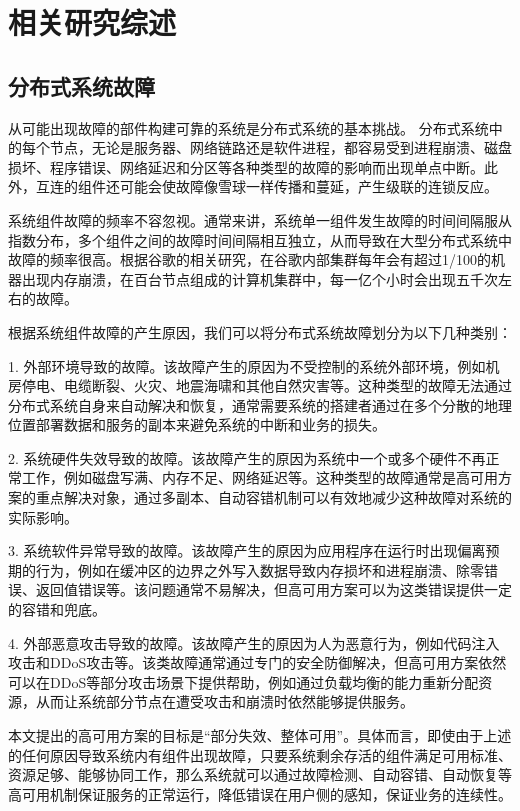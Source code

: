 
\chapter{相关研究综述}

\section{分布式系统故障}

从可能出现故障的部件构建可靠的系统是分布式系统的基本挑战。
分布式系统中的每个节点，无论是服务器、网络链路还是软件进程，都容易受到进程崩溃、磁盘损坏、程序错误、网络延迟和分区等各种类型的故障的影响而出现单点中断。此外，互连的组件还可能会使故障像雪球一样传播和蔓延，产生级联的连锁反应。

系统组件故障的频率不容忽视。通常来讲，系统单一组件发生故障的时间间隔服从指数分布，多个组件之间的故障时间间隔相互独立，从而导致在大型分布式系统中故障的频率很高。根据谷歌的相关研究\cite{beyer2016site}，在谷歌内部集群每年会有超过1/100的机器出现内存崩溃，在百台节点组成的计算机集群中，每一亿个小时会出现五千次左右的故障。

根据系统组件故障的产生原因，我们可以将分布式系统故障划分为以下几种类别\cite{michaud20062}：

1. 外部环境导致的故障。该故障产生的原因为不受控制的系统外部环境，例如机房停电、电缆断裂、火灾、地震海啸和其他自然灾害等。这种类型的故障无法通过分布式系统自身来自动解决和恢复，通常需要系统的搭建者通过在多个分散的地理位置部署数据和服务的副本来避免系统的中断和业务的损失。

2. 系统硬件失效导致的故障。该故障产生的原因为系统中一个或多个硬件不再正常工作，例如磁盘写满、内存不足、网络延迟等。这种类型的故障通常是高可用方案的重点解决对象，通过多副本、自动容错机制可以有效地减少这种故障对系统的实际影响。

3. 系统软件异常导致的故障。该故障产生的原因为应用程序在运行时出现偏离预期的行为，例如在缓冲区的边界之外写入数据导致内存损坏和进程崩溃、除零错误、返回值错误等。该问题通常不易解决，但高可用方案可以为这类错误提供一定的容错和兜底。

4. 外部恶意攻击导致的故障。该故障产生的原因为人为恶意行为，例如代码注入攻击和DDoS攻击等。该类故障通常通过专门的安全防御解决，但高可用方案依然可以在DDoS等部分攻击场景下提供帮助，例如通过负载均衡的能力重新分配资源，从而让系统部分节点在遭受攻击和崩溃时依然能够提供服务。

本文提出的高可用方案的目标是“部分失效、整体可用”。具体而言，即使由于上述的任何原因导致系统内有组件出现故障，只要系统剩余存活的组件满足可用标准、资源足够、能够协同工作，那么系统就可以通过故障检测、自动容错、自动恢复等高可用机制保证服务的正常运行，降低错误在用户侧的感知，保证业务的连续性。

